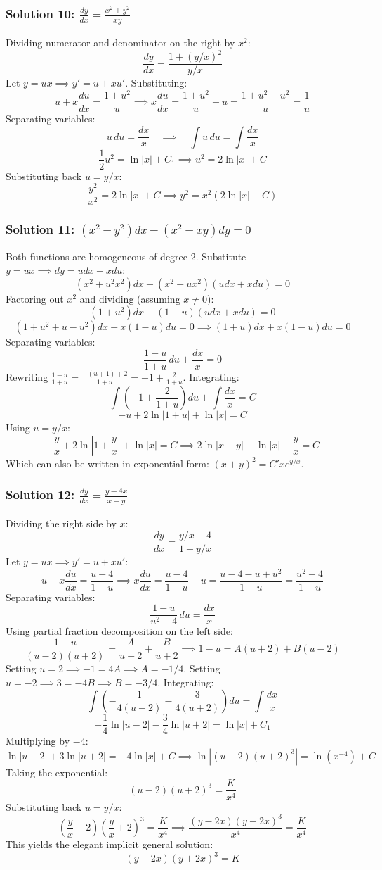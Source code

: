 \documentclass[11pt,letterpaper]{article}
\begin{document}
\subsubsection*{Solution 10: $\frac{dy}{dx} = \frac{x^2 + y^2}{xy}$}
Dividing numerator and denominator on the right by $x^2$:
\[ \frac{dy}{dx} = \frac{1 + (y/x)^2}{y/x} \]
Let $y = ux \implies y' = u + x u'$. Substituting:
\[ u + x\frac{du}{dx} = \frac{1+u^2}{u} \implies x\frac{du}{dx} = \frac{1+u^2}{u} - u = \frac{1+u^2-u^2}{u} = \frac{1}{u} \]
Separating variables:
\[ u \, du = \frac{dx}{x} \quad \implies \quad \int u \, du = \int \frac{dx}{x} \]
\[ \frac{1}{2}u^2 = \ln|x| + C_1 \implies u^2 = 2\ln|x| + C \]
Substituting back $u = y/x$:
\[ \frac{y^2}{x^2} = 2\ln|x| + C \implies y^2 = x^2(2\ln|x| + C) \]

\subsubsection*{Solution 11: $(x^2+y^2)dx + (x^2-xy)dy = 0$}
Both functions are homogeneous of degree 2. Substitute $y = ux \implies dy = u dx + x du$:
\[ (x^2 + u^2 x^2)dx + (x^2 - u x^2)(u dx + x du) = 0 \]
Factoring out $x^2$ and dividing (assuming $x \neq 0$):
\[ (1+u^2)dx + (1-u)(u dx + x du) = 0 \]
\[ (1+u^2 + u - u^2)dx + x(1-u)du = 0 \implies (1+u)dx + x(1-u)du = 0 \]
Separating variables:
\[ \frac{1-u}{1+u} \, du + \frac{dx}{x} = 0 \]
Rewriting $\frac{1-u}{1+u} = \frac{-(u+1)+2}{1+u} = -1 + \frac{2}{1+u}$. Integrating:
\[ \int \left( -1 + \frac{2}{1+u} \right) du + \int \frac{dx}{x} = C \]
\[ -u + 2\ln|1+u| + \ln|x| = C \]
Using $u = y/x$:
\[ -\frac{y}{x} + 2\ln\left| 1 + \frac{y}{x} \right| + \ln|x| = C \implies 2\ln|x+y| - \ln|x| - \frac{y}{x} = C \]
Which can also be written in exponential form: $(x+y)^2 = C' x e^{y/x}$.

\subsubsection*{Solution 12: $\frac{dy}{dx} = \frac{y-4x}{x-y}$}
Dividing the right side by $x$:
\[ \frac{dy}{dx} = \frac{y/x - 4}{1 - y/x} \]
Let $y = ux \implies y' = u + x u'$:
\[ u + x\frac{du}{dx} = \frac{u-4}{1-u} \implies x\frac{du}{dx} = \frac{u-4}{1-u} - u = \frac{u-4-u+u^2}{1-u} = \frac{u^2-4}{1-u} \]
Separating variables:
\[ \frac{1-u}{u^2-4} \, du = \frac{dx}{x} \]
Using partial fraction decomposition on the left side:
\[ \frac{1-u}{(u-2)(u+2)} = \frac{A}{u-2} + \frac{B}{u+2} \implies 1-u = A(u+2) + B(u-2) \]
Setting $u = 2 \implies -1 = 4A \implies A = -1/4$.
Setting $u = -2 \implies 3 = -4B \implies B = -3/4$.
Integrating:
\[ \int \left( -\frac{1}{4(u-2)} - \frac{3}{4(u+2)} \right) du = \int \frac{dx}{x} \]
\[ -\frac{1}{4}\ln|u-2| - \frac{3}{4}\ln|u+2| = \ln|x| + C_1 \]
Multiplying by $-4$:
\[ \ln|u-2| + 3\ln|u+2| = -4\ln|x| + C \implies \ln| (u-2)(u+2)^3 | = \ln(x^{-4}) + C \]
Taking the exponential:
\[ (u-2)(u+2)^3 = \frac{K}{x^4} \]
Substituting back $u = y/x$:
\[ \left( \frac{y}{x} - 2 \right) \left( \frac{y}{x} + 2 \right)^3 = \frac{K}{x^4} \implies \frac{(y-2x)(y+2x)^3}{x^4} = \frac{K}{x^4} \]
This yields the elegant implicit general solution:
\[ (y-2x)(y+2x)^3 = K \]
\end{document}
